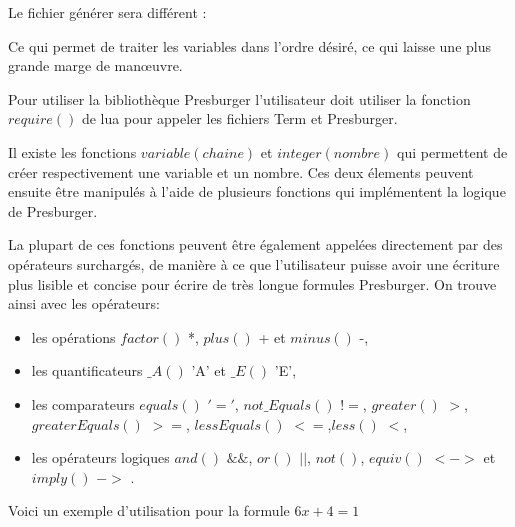 Le fichier générer sera différent : \vspace{0.5cm}


Ce qui permet de traiter les variables dans l'ordre désiré, ce qui laisse une plus grande marge de man\oe{}uvre.\\\par

Pour utiliser la bibliothèque Presburger l'utilisateur doit utiliser la fonction $require()$ de lua pour appeler les fichiers Term et Presburger.\\\par

Il existe les fonctions $variable(chaine)$ et $integer(nombre)$ qui permettent de créer respectivement une variable et un nombre. Ces deux élements peuvent ensuite être manipulés à l'aide de plusieurs fonctions qui implémentent la logique de Presburger.\\\par

La plupart de ces fonctions peuvent être également appelées directement par des opérateurs surchargés, de manière à ce que l'utilisateur puisse avoir une écriture plus lisible et concise pour écrire de très longue formules Presburger. On trouve ainsi avec les opérateurs:
\begin{itemize}
 \item les opérations $factor()$ *, $plus()$ + et $minus()$ -,
 \item les quantificateurs $\_A()$ 'A' et $\_E()$ 'E',
 \item les comparateurs $equals()$ $'='$, $not\_Equals()$ $!=$, $greater()$ $>$, $greaterEquals()$ $>=$, $lessEquals()$ $<=$,$less()$ $<$,
 \item les opérateurs logiques $and()$ $\&\&$, $or()$ $||$, $not()$, $equiv()$ $<->$  et $imply()$ $->$ .
\end{itemize}
Voici un exemple d'utilisation pour la formule $6x + 4 = 1$\\
 
